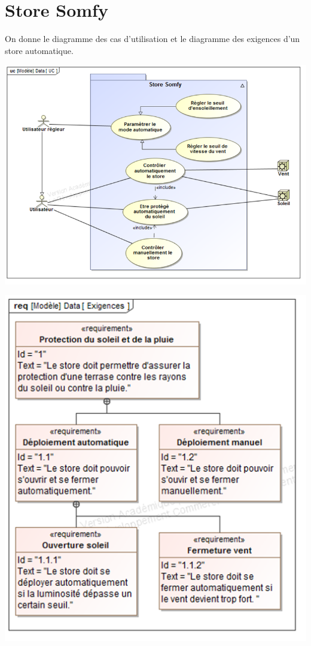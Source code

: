 \documentclass[10pt]{article}
\begin{document}





\section{Store Somfy}
 
\begin{minipage}[c]{.48\linewidth}
On donne le diagramme des cas d’utilisation et le diagramme des exigences d’un store automatique.
\begin{center}
\includegraphics[width=.95\textwidth]{images/uc}
\end{center}
\end{minipage} \hfill
\begin{minipage}[c]{.45\linewidth}
\begin{center}
\includegraphics[width=.85\textwidth]{images/req}
\end{center}
\end{minipage} 
\end{document}
